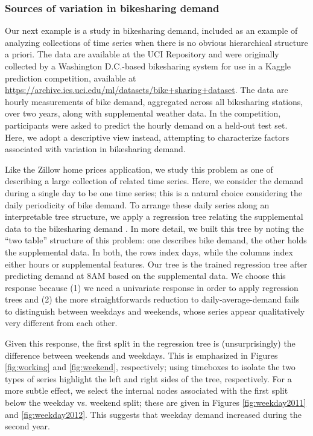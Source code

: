 \subsubsection{Sources of variation in bikesharing
demand}\label{bikesharing-study}

Our next example is a study in bikesharing demand, included as an example of
analyzing collections of time series when there is no obvious hierarchical
structure a priori. The data are available at the UCI Repository and were
originally collected by a Washington D.C.-based bikesharing system for use in a
Kaggle prediction competition, available at
\url{https://archive.ics.uci.edu/ml/datasets/bike+sharing+dataset}. The data are
hourly measurements of bike demand, aggregated across all bikesharing stations,
over two years, along with supplemental weather data. In the competition,
participants were asked to predict the hourly demand on a held-out test set.
Here, we adopt a descriptive view instead, attempting to characterize factors
associated with variation in bikesharing demand.

Like the Zillow home prices application, we study this problem as one of
describing a large collection of related time series. Here, we consider
the demand during a single day to be one time series; this is a natural
choice considering the daily periodicity of bike demand. To arrange
these daily series along an interpretable tree structure, we apply a
regression tree relating the supplemental data to the bikesharing demand
\citep{breiman1984classification}. In more
detail, we built this tree by noting the ``two table'' structure of this
problem: one describes bike demand, the other holds the supplemental
data. In both, the rows index days, while the columns index either hours
or supplemental features. Our tree is the trained regression tree after
predicting demand at 8AM based on the supplemental data. We choose this
response because (1) we need a univariate response in order to apply
regression trees and (2) the more straightforwards reduction to
daily-average-demand fails to distinguish between weekdays and weekends,
whose series appear qualitatively very different from each other.

Given this response, the first split in the regression tree is
(unsurprisingly) the difference between weekends and weekdays. This is
emphasized in Figures \ref{fig:working} and \ref{fig:weekend}, respectively;
using timeboxes to isolate the two types of series highlight the left and right
sides of the tree, respectively. For a more subtle effect, we select the
internal nodes associated with the first split below the weekday vs. weekend
split; these are given in Figures \ref{fig:weekday2011} and
\ref{fig:weekday2012}. This suggests that weekday demand increased during the
second year.

